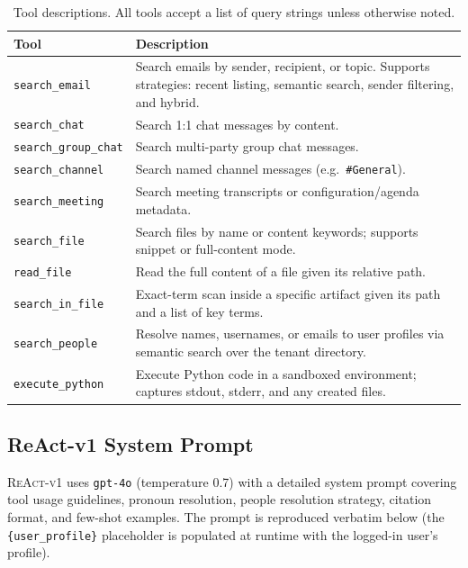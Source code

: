 \begin{table}[htbp]
\centering
\footnotesize
\caption{Tool descriptions. All tools accept a list of query strings unless otherwise noted.}
\label{tab:tool_descriptions}
\begin{tabular}{p{3.2cm}p{9.8cm}}
\toprule
Tool & Description \\
\midrule
\texttt{search\_email}      & Search emails by sender, recipient, or topic. Supports strategies: recent listing, semantic search, sender filtering, and hybrid. \\
\texttt{search\_chat}       & Search 1:1 chat messages by content. \\
\texttt{search\_group\_chat} & Search multi-party group chat messages. \\
\texttt{search\_channel}    & Search named channel messages (e.g.\ \texttt{\#General}). \\
\texttt{search\_meeting}    & Search meeting transcripts or configuration/agenda metadata. \\
\texttt{search\_file}       & Search files by name or content keywords; supports snippet or full-content mode. \\
\texttt{read\_file}         & Read the full content of a file given its relative path. \\
\texttt{search\_in\_file}   & Exact-term scan inside a specific artifact given its path and a list of key terms. \\
\texttt{search\_people}     & Resolve names, usernames, or emails to user profiles via semantic search over the tenant directory. \\
\texttt{execute\_python}    & Execute Python code in a sandboxed environment; captures stdout, stderr, and any created files. \\
\bottomrule
\end{tabular}
\end{table}

\subsection{ReAct-v1 System Prompt}
\label{app:prompt-v1}

\textsc{ReAct-v1} uses \texttt{gpt-4o} (temperature 0.7) with a detailed
system prompt covering tool usage guidelines, pronoun resolution, people
resolution strategy, citation format, and few-shot examples. The prompt is
reproduced verbatim below (the \texttt{\{user\_profile\}} placeholder is
populated at runtime with the logged-in user's profile).

